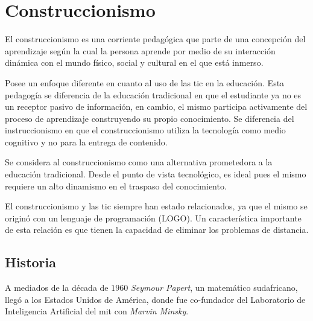 \section{Construccionismo}
\label{sec:tics_CONSTRUCCIONISMO}

El construccionismo es una corriente pedagógica que parte de una concepción del
aprendizaje según la cual la persona aprende por medio de su interacción
dinámica con el mundo físico, social y cultural en el que está
inmerso\cite{valdivia:sg}.

Posee un enfoque diferente en cuanto al uso de las \Gls{tic} en la educación.
Esta pedagogía se diferencia de la educación tradicional en que el estudiante ya
no es un receptor pasivo de información, en cambio, el mismo participa
activamente del proceso de aprendizaje construyendo su propio conocimiento. Se
diferencia del instruccionismo en que el construccionismo utiliza la tecnología
como medio cognitivo y no para la entrega de contenido.

Se considera al construccionismo como una alternativa prometedora a la educación
tradicional. Desde el punto de vista tecnológico, es ideal pues el mismo
requiere un alto dinamismo en el traspaso del
conocimiento\cite{sasha:construtivism}. 

El construccionismo y las \Gls{tic} siempre han estado relacionados, ya que el
mismo se originó con un lenguaje de programación (LOGO)\cite{ict:ttc}. Un
característica importante de esta relación es que tienen la capacidad de
eliminar los problemas de distancia\cite{guenaga2013serious}.


\subsection{Historia}

A mediados de la década de $1960$ \textit{Seymour Papert}, un matemático
sudafricano, llegó a los Estados Unidos de América, donde fue co-fundador del
Laboratorio de Inteligencia Artificial del \Gls{mit} con \textit{Marvin
    Minsky}\cite{logo:sg}. 


